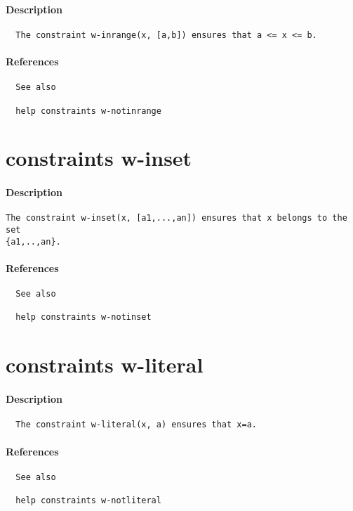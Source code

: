 \paragraph{Description}
{\footnotesize
\begin{verbatim}
  The constraint w-inrange(x, [a,b]) ensures that a <= x <= b.
\end{verbatim}
}
\paragraph{References}
{\footnotesize
\begin{verbatim}
  See also

  help constraints w-notinrange
\end{verbatim}
}
\section{constraints w-inset}
\paragraph{Description}
{\footnotesize
\begin{verbatim}
The constraint w-inset(x, [a1,...,an]) ensures that x belongs to the set 
{a1,..,an}.
\end{verbatim}
}
\paragraph{References}
{\footnotesize
\begin{verbatim}
  See also

  help constraints w-notinset
\end{verbatim}
}
\section{constraints w-literal}
\paragraph{Description}
{\footnotesize
\begin{verbatim}
  The constraint w-literal(x, a) ensures that x=a.
\end{verbatim}
}
\paragraph{References}
{\footnotesize
\begin{verbatim}
  See also

  help constraints w-notliteral
\end{verbatim}
}
